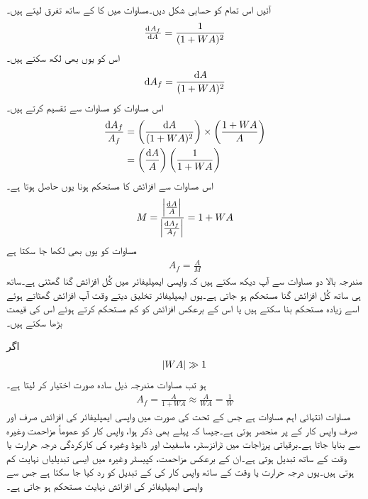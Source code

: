 آئیں اس تمام کو حسابی شکل دیں۔مساوات  میں   کا  کے ساتھ تفرق لیتے ہیں۔
\begin{align*}
\od{A_f}{A}=\frac{1}{(1+W A)^2}
\end{align*}
اس کو یوں بھی لکھ سکتے ہیں۔
\begin{align*}
\textup{d} A_f=\frac{\textup{d} A}{(1+W A)^2}
\end{align*}
 اس مساوات کو مساوات  سے تقسیم کرتے ہیں۔
\begin{align*}
\frac{\textup{d} A_f}{A_f}&=\left( \frac{\textup{d} A}{(1+W A)^2} \right ) \times \left ( \frac{1+W A}{A} \right )\\
&=\left (\frac{\textup{d} A}{A} \right) \left(\frac{1}{1+W A} \right )
\end{align*}
اس مساوات سے افزائش کا مستحکم  ہونا یوں حاصل ہوتا ہے۔
\begin{align} \label{مساوات_واپسی_مستحکمیت}
M=\frac{\abs{\frac{\textup{d}A}{A}}}{\abs{\frac{\textup{d}A_f}{A_f}}}=1+W A
\end{align}
مساوات  کو یوں بھی لکھا جا سکتا ہے
\begin{align}
A_f = \frac{A}{M}
\end{align}
مندرجہ بالا دو مساوات سے آپ دیکھ سکتے ہیں کہ واپسی ایمپلیفائر میں کُل افزائش  گنا گھٹتی    ہے۔ساتھ ہی ساتھ  کُل افزائش  گنا مستحکم ہو جاتی ہے۔یوں ایمپلیفائر تخلیق دیتے وقت آپ افزائش گھٹاتے    ہوئے اسے زیادہ مستحکم بنا سکتے ہیں یا اس کے برعکس افزائش کو کم مستحکم کرتے ہوئے اس کی قیمت بڑھا سکتے ہیں۔

اگر
\begin{align} \label{مساوات_واپسی_مستحکم_افزائش_کی_شرط}
\abs{W A} \gg 1
\end{align}
ہو تب مساوات  مندرجہ ذیل سادہ صورت اختیار کر لیتا ہے۔
\begin{align} \label{مساوات_واپسی_مستحکم_افزائش}
A_f  = \frac{A}{1+W A} \approx \frac{A}{W A} =\frac{1}{W}
\end{align}
مساوات  انتہائی اہم مساوات ہے جس کے تحت   کی صورت میں واپسی ایمپلیفائر کی افزائش صرف اور صرف واپس کار کے  پر منحصر ہوتی ہے۔جیسا کہ پہلے بھی ذکر ہوا، واپس کار کو عموماً مزاحمت وغیرہ سے بنایا جاتا ہے۔برقیاتی پرزاجات میں ٹرانزسٹر، ماسفیٹ اور ڈایوڈ وغیرہ کی کارکردگی درجہ حرارت یا وقت کے ساتھ تبدیل ہوتی ہے۔ان کے برعکس مزاحمت، کپیسٹر وغیرہ میں ایسی تبدیلیاں نہایت کم ہوتی ہیں۔یوں درجہ حرارت یا وقت کے ساتھ واپس کار کی  کے تبدیل کو رد کیا جا سکتا ہے جس سے واپسی ایمپلیفائر کی افزائش نہایت مستحکم ہو جاتی ہے۔

